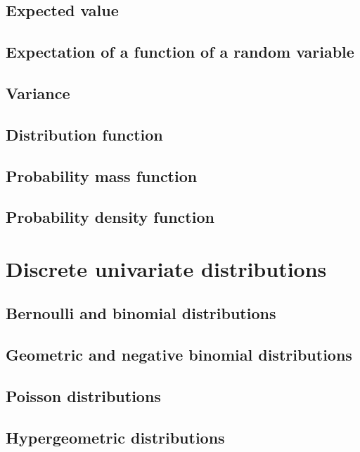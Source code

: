 \documentclass[11pt]{article}
\theoremstyle{definition}
\theoremstyle{plain}
\theoremstyle{remark}
\begin{document}
\subsection{Expected value}

\subsection{Expectation of a function of a random variable}

\subsection{Variance}

\subsection{Distribution function}

\subsection{Probability mass function}

\subsection{Probability density function}

\section{Discrete univariate distributions}

\subsection{Bernoulli and binomial distributions}

\subsection{Geometric and negative binomial distributions}

\subsection{Poisson distributions}

\subsection{Hypergeometric distributions}
\end{document}
